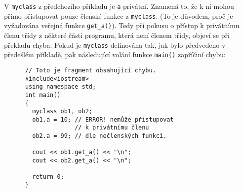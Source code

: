     \begin{example}
      V \lstinline[basicstyle=\ttfamily]!myclass! z předchozího příkladu je \lstinline[basicstyle=\ttfamily]!a! privátní. Znamená
      to, že k ní mohou přímo přistupovat pouze členské funkce z \lstinline[basicstyle=\ttfamily]!myclass!. (To je důvodem, proč
      je vyžadována veřejná funkce \lstinline[basicstyle=\ttfamily]!get_a()!). Tedy při pokusu o přístup k privátnímu členu třídy
       z některé části programu, která není členem třídy, objeví se při překladu chyba. Pokud je
      \lstinline[basicstyle=\ttfamily]!myclass! definována tak, jak bylo předvedeno v předešlém příkladě, pak následující volání
      funkce \lstinline[basicstyle=\ttfamily]!main()! zapříčiní chybu:

      \begin{lstlisting}
      // Toto je fragment obsahující chybu.
      #include<iostream>
      using namespace std;
      int main()
      {
        myclass ob1, ob2;
        ob1.a = 10; // ERROR! nemůže přistupovat
                    // k privátnímu členu
        ob2.a = 99; // dle nečlenských funkcí.

        cout << ob1.get_a() << "\n";
        cout << ob2.get_a() << "\n";

        return 0;
      }
     \end{lstlisting}
    \end{example}

